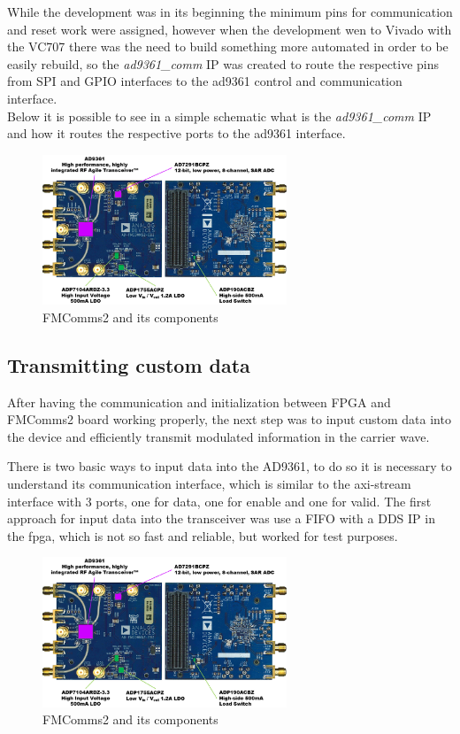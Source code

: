 While the development was in its beginning the minimum pins for communication
and reset work were assigned, however when the development wen to Vivado with
the VC707 there was the need to build something more automated in order to be
easily rebuild, so the \emph{ad9361\_comm} IP was created to route the respective
pins from SPI and GPIO interfaces to the ad9361 control and communication interface.\\

Below it is possible to see in a simple schematic what is the \emph{ad9361\_comm}
IP and how it routes the respective ports to the ad9361 interface.

\begin{figure}[htbp]
    \centering
    \includegraphics[width=0.65\textwidth]{./figures/fmcomms2_pic}
    \caption{ FMComms2 and its components
    \label{fig:fmcomm}}
\end{figure}

\subsection{Transmitting custom data}

After having the communication and initialization between FPGA and FMComms2
board working properly, the next step was to input custom data into the device
and efficiently transmit modulated information in the carrier wave.

There is two basic ways to input data into the AD9361, to do so it is necessary to understand
its communication interface, which is similar to the axi-stream interface with
3 ports, one for data, one for enable and one for valid. The first approach for
input data into the transceiver was use a FIFO with a DDS IP in the fpga, which
is not so fast and reliable, but worked for test purposes.

\begin{figure}[htbp]
    \centering
    \includegraphics[width=0.65\textwidth]{./figures/fmcomms2_pic}
    \caption{ FMComms2 and its components
    \label{fig:fmcomm}}
\end{figure}


